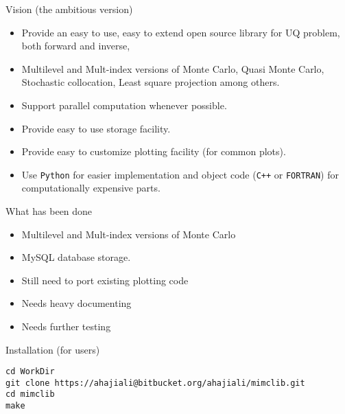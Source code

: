 {
\nofooter \noheader \frame[noframenumbering]{\titlepage}
}

\begin{frame}{Vision (the ambitious version)}
  \begin{itemize}
  \item Provide an easy to use, easy to extend open source
    library for UQ problem, both forward and inverse,
  \item Multilevel and Mult-index versions of Monte Carlo, Quasi Monte
    Carlo, Stochastic collocation, Least square projection among
    others.
  \item Support parallel computation whenever possible.
  \item Provide easy to use storage facility.
  \item Provide easy to customize plotting facility (for common plots).
  \item Use \texttt{Python} for easier implementation and object code (\texttt{C++} or
    \texttt{FORTRAN}) for computationally expensive parts.
  \end{itemize}
\end{frame}

\begin{frame}{What has been done}
  \begin{itemize}
  \item Multilevel and Mult-index versions of Monte Carlo
  \item MySQL database storage.
  \item Still need to port existing plotting code
  \item Needs heavy documenting
  \item Needs further testing
  \end{itemize}
\end{frame}

\begin{frame}[fragile]{Installation (for users)}
\begin{verbatim}
cd WorkDir
git clone https://ahajiali@bitbucket.org/ahajiali/mimclib.git
cd mimclib
make
\end{verbatim}
\end{frame}

